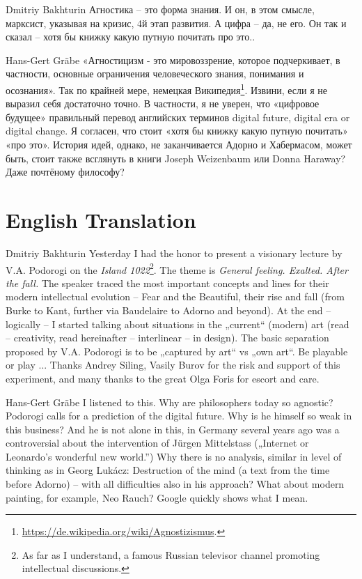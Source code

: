\documentclass[11pt,a4paper]{article}
\begin{document}
Dmitriy Bakhturin Агностика -- это форма знания. И он, в этом смысле,
марксист, указывая на кризис, 4й этап развития. А цифра -- да, не его. Он так
и сказал -- хотя бы книжку какую путную почитать про это..

Hans-Gert Gräbe «Агностицизм - это мировоззрение, которое подчеркивает, в
частности, основные ограничения человеческого знания, понимания и
осознания». Так по крайней мере, немецкая
Википедия\footnote{\url{https://de.wikipedia.org/wiki/Agnostizismus}.}.
Извини, если я не выразил себя достаточно точно. В частности, я не уверен, что
«цифровое будущее» правильный перевод английских терминов digital future,
digital era or digital change. Я согласен, что стоит «хотя бы книжку какую
путную почитать» «про это». История идей, однако, не заканчивается Адорно и
Хабермасом, может быть, стоит также всглянуть в книги Joseph Weizenbaum или
Donna Haraway? Даже почтёному философу?

\section{English Translation}

Dmitriy Bakhturin Yesterday I had the honor to present a visionary lecture by
V.A. Podorogi on the \emph{Island 1022}\footnote{As far as I understand, a
  famous Russian televisor channel promoting intellectual discussions.}. The
theme is \emph{General feeling.  Exalted. After the fall.} The speaker traced
the most important concepts and lines for their modern intellectual evolution
-- Fear and the Beautiful, their rise and fall (from Burke to Kant, further
via Baudelaire to Adorno and beyond). At the end -- logically -- I started
talking about situations in the „current“ (modern) art (read -- creativity,
read hereinafter -- interlinear -- in design). The basic separation proposed
by V.A. Podorogi is to be „captured by art“ vs „own art“. Be playable or play
... Thanks Andrey Siling, Vasily Burov for the risk and support of this
experiment, and many thanks to the great Olga Foris for escort and care.

Hans-Gert Gräbe I listened to this. Why are philosophers today so agnostic?
Podorogi calls for a prediction of the digital future. Why is he himself so
weak in this business? And he is not alone in this, in Germany several years
ago was a controversial about the intervention of Jürgen Mittelstass
(„Internet or Leonardo’s wonderful new world.”) Why there is no analysis,
similar in level of thinking as in Georg Lukácz: Destruction of the mind (a
text from the time before Adorno) -- with all difficulties also in his
approach? What about modern painting, for example, Neo Rauch? Google quickly
shows what I mean.
\end{document}
